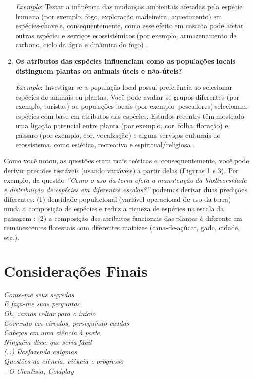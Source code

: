 \documentclass[
]{book}
\renewenvironment{quote}{\begin{VF}}{\end{VF}}
\begin{document}
\begin{enumerate}
  \emph{Exemplo}: Testar a influência das mudanças ambientais afetadas pela espécie humana (por exemplo, fogo, exploração madeireira, aquecimento) em espécies-chave e, consequentemente, como esse efeito em cascata pode afetar outras espécies e serviços ecossistêmicos (por exemplo, armazenamento de carbono, ciclo da água e dinâmica do fogo) \citep{lindenmayer_hidden_2018}.
\item
  \textbf{Os atributos das espécies influenciam como as populações locais distinguem plantas ou animais úteis e não-úteis?}

  \emph{Exemplo}: Investigar se a população local possui preferência ao selecionar espécies de animais ou plantas. Você pode avaliar se grupos diferentes (por exemplo, turistas) ou populações locais (por exemplo, pescadores) selecionam espécies com base em atributos das espécies. Estudos recentes têm mostrado uma ligação potencial entre planta (por exemplo, cor, folha, floração) e pássaro (por exemplo, cor, vocalzação) e alguns serviços culturais do ecossistema, como estética, recreativa e espiritual/religiosa \citep{goodness_exploring_2016}.
\end{enumerate}

Como você notou, as questões eram mais teóricas e, consequentemente, você pode derivar prediões testáveis (usando variáveis) a partir delas (Figuras 1 e 3). Por exemplo, da questão \emph{``Como o uso da terra afeta a manutenção da biodiversidade e distribuição de espécies em diferentes escalas?''} podemos derivar duas predições diferentes: (1) densidade populacional (variável operacional de uso da terra) muda a composição de espécies e reduz a riqueza de espécies na escala da paisagem \citep[predição derivada da hipótese da homogeneização biótica:][]{solar_how_2015}; (2) a composição dos atributos funcionais das plantas é diferente em remanescentes florestais com diferentes matrizes (cana-de-açúcar, gado, cidade, etc.).

\hypertarget{considerauxe7uxf5es-finais}{%
\section{Considerações Finais}\label{considerauxe7uxf5es-finais}}

\begin{quote}
\emph{Conte-me seus segredos}\\
\emph{E faça-me suas perguntas}\\
\emph{Oh, vamos voltar para o início}\\
\emph{Correndo em círculos, perseguindo caudas}\\
\emph{Cabeças em uma ciência à parte}\\
\emph{Ninguém disse que seria fácil}\\
\emph{(\ldots) Desfazendo enígmas}\\
\emph{Questões da ciência, ciência e progresso}\\
\emph{- O Cientista, Coldplay}
\end{quote}
\end{document}
